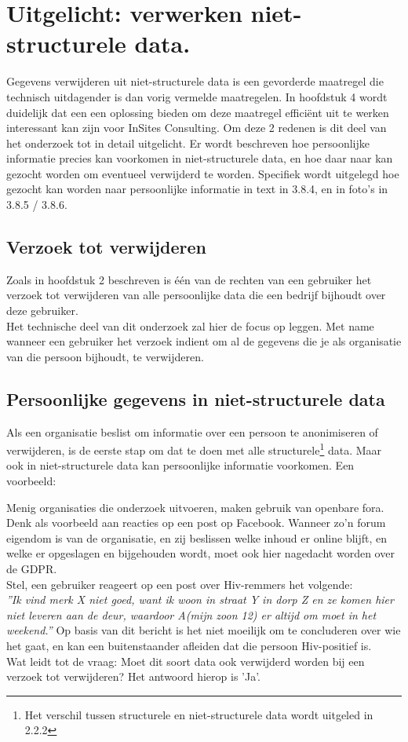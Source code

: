  
\section{Uitgelicht: verwerken niet-structurele data.}

Gegevens verwijderen uit niet-structurele data is een gevorderde maatregel die technisch uitdagender is dan vorig vermelde maatregelen. In hoofdstuk 4 wordt duidelijk dat een een oplossing bieden om deze maatregel efficiënt uit te werken interessant kan zijn voor InSites Consulting. Om deze 2 redenen is dit deel van het onderzoek tot in detail uitgelicht. Er wordt 
beschreven hoe persoonlijke informatie precies kan voorkomen in niet-structurele data, en hoe daar naar kan gezocht worden om eventueel verwijderd te worden.
Specifiek wordt uitgelegd hoe gezocht kan worden naar persoonlijke informatie in text in 3.8.4, en in foto's in 3.8.5 / 3.8.6. 

\subsection{Verzoek tot verwijderen}
Zoals in hoofdstuk 2 beschreven is één van de rechten van een gebruiker het verzoek tot verwijderen van alle persoonlijke data die een bedrijf bijhoudt over deze gebruiker. \\
Het technische deel van dit onderzoek zal hier de focus op leggen. Met name wanneer een gebruiker het verzoek indient om al de gegevens die je als organisatie van die persoon bijhoudt, te verwijderen. 

\subsection{Persoonlijke gegevens in niet-structurele data}
Als een organisatie beslist om informatie over een persoon te anonimiseren of verwijderen, is de eerste stap om dat te doen met alle structurele\footnote{Het verschil tussen structurele en niet-structurele data wordt uitgeled in 2.2.2} data. Maar ook in niet-structurele data kan persoonlijke informatie voorkomen. Een voorbeeld: 

Menig organisaties die onderzoek uitvoeren, maken gebruik van openbare fora. Denk als voorbeeld aan reacties op een post op Facebook. Wanneer zo'n forum eigendom is van de organisatie, en zij beslissen welke inhoud er online blijft, en welke er opgeslagen en bijgehouden wordt, moet ook hier nagedacht worden over de GDPR. \\ Stel, een gebruiker reageert op een post over Hiv-remmers het volgende:\\
 \textit{”Ik vind merk X niet goed, want ik woon in straat Y in dorp Z en ze komen hier niet leveren aan de deur, waardoor A(mijn zoon 12) er altijd om moet in het weekend.”}
Op basis van dit bericht is het niet moeilijk om te concluderen over wie het gaat, en kan een buitenstaander afleiden dat die persoon Hiv-positief is. \\ Wat leidt tot de vraag: Moet dit soort data ook verwijderd worden bij een verzoek tot verwijderen? Het antwoord hierop is 'Ja'.

